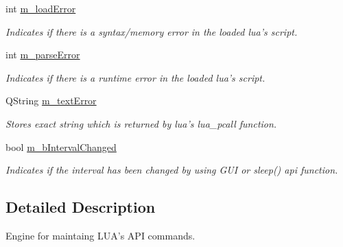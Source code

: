 \begin{DoxyCompactItemize}
int \hyperlink{class_lua_engine_af8dca74620280060399b5b7dd937af44}{m\-\_\-load\-Error}
\begin{DoxyCompactList}\small\item\em Indicates if there is a syntax/memory error in the loaded lua's script. \end{DoxyCompactList}\item 
int \hyperlink{class_lua_engine_ac7c65e343f73a0dadcbe2d5f1a5842f3}{m\-\_\-parse\-Error}
\begin{DoxyCompactList}\small\item\em Indicates if there is a runtime error in the loaded lua's script. \end{DoxyCompactList}\item 
Q\-String \hyperlink{class_lua_engine_a0cb5dc043a3f9b162ad97245cd7e6956}{m\-\_\-text\-Error}
\begin{DoxyCompactList}\small\item\em Stores exact string which is returned by lua's lua\-\_\-pcall function. \end{DoxyCompactList}\item 
bool \hyperlink{class_lua_engine_add74083d158ee3543d0644c0b6349c5d}{m\-\_\-b\-Interval\-Changed}
\begin{DoxyCompactList}\small\item\em Indicates if the interval has been changed by using G\-U\-I or sleep() api function. \end{DoxyCompactList}\end{DoxyCompactItemize}


\subsection{Detailed Description}
Engine for maintaing L\-U\-A's A\-P\-I commands. 

